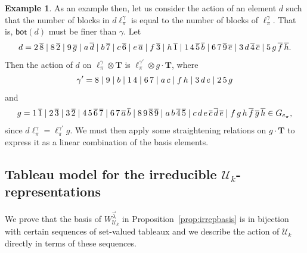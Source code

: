 \documentclass[10pt]{amsart}
\theoremstyle{definition}
\newtheorem{example}[theorem]{Example}
\theoremstyle{remark}
\begin{document}
\begin{example}
As an example then, let us consider the action of an element $d$ such that
the number of blocks in $d \ell^\gamma_\pi$ is equal to the number of blocks
of $\ell^\gamma_\pi$.  That is, $\mathsf{bot}(d)$ must be finer than
$\gamma$.  Let 
\begin{equation*}
   d=  2\,\overline{8} \mid
            8\,\overline{2} \mid 9\,\overline{\gg} \mid \aa\,\overline{\dd} \mid \bb\,\overline{7} \mid \cc\,\overline{6} \mid \ee\,\overline{\aa} \mid
            \ff\,\overline{3} \mid \hh\,\overline{1} \mid
            1\,4\,\overline{5}\, \overline{\bb} \mid 6\,7\,\overline{9}\,\overline{\ee} \mid 3\,\dd\,\overline{4}\, \overline{\cc} \mid 5\,\gg\,\overline{\ff}\,\overline{\hh}.
\end{equation*}
Then the action of $d$ on $\ell_\pi^\gamma \otimes \mathbf{T}$ is
$\ell^{\gamma'}_\pi \otimes g \cdot {\mathbf T}$, where
\begin{equation*}
    \gamma' =
                8 \mid
                9 \mid
                \bb \mid
                1\,4 \mid
                6\,7 \mid
                \aa\,\cc \mid
                \ff\,\hh \mid
                3\,\dd\,\ee \mid
                2\,5\,\gg
 \end{equation*}
and 
\begin{equation*}
     g=1\, \overline{1} \mid
        2\, \overline{3} \mid
        3\, \overline{2} \mid
        4\,5\,\overline{6}\,\overline{7} \mid
        6\,7\,\overline{\aa}\,\overline{\bb} \mid
        8\,9\,\overline{8}\,\overline{9} \mid
        \aa\,\bb\,\overline{4}\,\overline{5} \mid
        \cc\,\dd\,\ee\,\overline{\cc}\,\overline{\dd}\,\overline{\ee} \mid
        \ff\,\gg\,\hh\,\overline{\ff}\,\overline{\gg}\,\overline{\hh}\in G_{e_\pi}, 
\end{equation*}
since $d \ell_\pi^\gamma = \ell_\pi^{\gamma'} g$. We must then
apply some straightening relations on $g \cdot \mathbf{T}$ to express it as
a linear combination of the basis elements.
\end{example}


\subsection{Tableau model for the irreducible $\mathcal{U}_k$-representations}
\label{sec:irreps-of-UBP-algebra-2}
We prove that the basis of $W_{\mathcal{U}_k}^{\vec{\lambda}}$ in
Proposition~\ref{prop:irrepbasis} is in bijection with certain sequences of
set-valued tableaux and we describe the action of $\mathcal{U}_k$ directly in
terms of these sequences.
\end{document}
